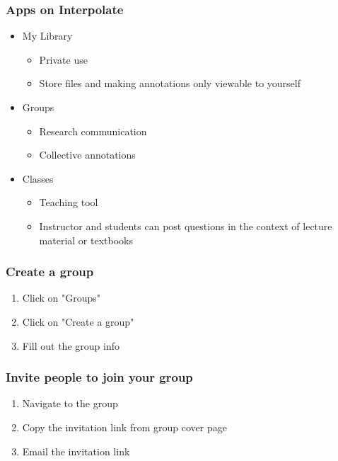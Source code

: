 \documentclass{beamer}
\begin{document}
\begin{frame}
\frametitle{Apps on Interpolate}
\begin{itemize}
\item My Library
  \begin{itemize}
  \item Private use
  \item Store files and making annotations only viewable
  to yourself
  \end{itemize}

\pause
\item Groups
  \begin{itemize}
  \item Research communication 
  \item Collective annotations
  \end{itemize}

\pause 

\item Classes

  \begin{itemize}
  \item Teaching tool
  \item Instructor and students can post questions
  in the context of lecture material or textbooks
  \end{itemize}

\end{itemize}
\end{frame}

\begin{frame}
\frametitle{Create a group}
\begin{enumerate}
\item Click on "Groups"
\item Click on "Create a group"
\item Fill out the group info
\end{enumerate}

\end{frame}

\begin{frame}
\frametitle{Invite people to join your group}
\begin{enumerate}
\item Navigate to the group
\item Copy the invitation link from group cover page
\item Email the invitation link 
\end{enumerate}
\end{frame}
\end{document}
